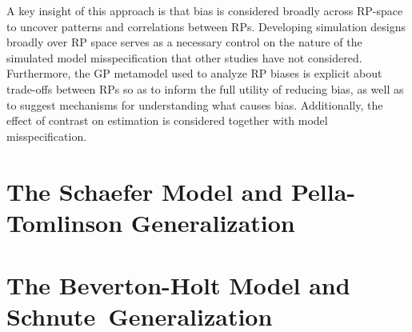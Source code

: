 \documentclass[12pt]{ucscthesis}
\begin{document}
%
A key insight of this approach is that bias is considered broadly across RP-space to
uncover patterns and correlations between RPs. %
Developing simulation designs broadly over RP space serves as a necessary 
control on the nature of the simulated model misspecification that other studies 
have not considered. %
Furthermore, the GP metamodel used to analyze RP biases is explicit about 
trade-offs between RPs %
so as to inform the full utility of reducing bias, as well as to suggest mechanisms for
understanding what causes bias. Additionally, the effect of contrast on estimation
is considered together with model misspecification. %



%
\chapter{The Schaefer Model and Pella-Tomlinson Generalization\label{ptChapter}}


%
\chapter{The Beverton-Holt Model and \mbox{Schnute Generalization}\label{schnuteChapter}}
%

\end{document}
